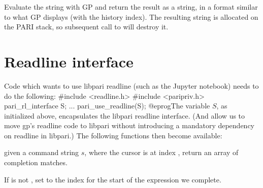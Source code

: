 Evaluate the string  with GP and return the result as a string,
in a format similar to what GP displays (with the history index).
The resulting string is allocated on the PARI stack, so subsequent call
to  will destroy it.

\section{Readline interface}

Code which wants to use libpari readline (such as the Jupyter notebook)
needs to do the following:
\bprog
#include <readline.h>
#include <paripriv.h>
pari_rl_interface S;
...
pari_use_readline(S);
@eprog\noindent The variable $S$, as initialized above, encapsulates
the libpari readline interface. (And allow us to move gp's readline code
to libpari without introducing a mandatory dependency on readline in
libpari.) The following functions then become available:

 given a command string $s$, where the cursor
is at index , return an array of completion matches.

If  is not , set  to the index for the
start of the expression we complete.

